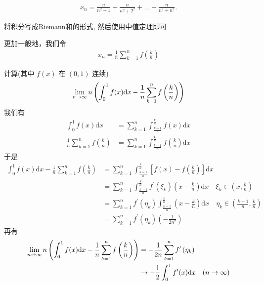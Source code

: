 \begin{exercise}[series=exer]
  \begin{align*}
      x_{n} = \frac{n}{n^{2} + 1} + \frac{n}{n^{2} + 2^{2}} + \dots + \frac{n}{n^{2} + n^{2}}.
  \end{align*}
  \begin{hint}
    将积分写成Riemann和的形式, 然后使用中值定理即可
  \end{hint}
  \begin{answer}
    更加一般地，我们令
    \begin{align*}
      x_{n}=\frac{1}{n} \sum_{k=1}^{n} f\left(\frac{k}{n}\right)  
    \end{align*}

   计算(其中 $f(x)$ 在 $(0,1)$ 连续)
  \begin{align*}
    \lim_{n \to \infty} n\left(\int_{0}^{1} f(x) \mathrm{d} x-\frac{1}{n} \sum_{k=1}^{n} f\left(\frac{k}{n}\right)\right)
  \end{align*}
  我们有
  \begin{align*}
    \int_{0}^{1} f(x) \mathrm{d} x &=\sum_{k=1}^{n} \int_{\frac{k-1}{n}}^{\frac{k}{n}} f(x) \mathrm{d} x \\
    \frac{1}{n} \sum_{k=1}^{n} f\left(\frac{k}{n}\right) &=\sum_{k=1}^{n} \int_{\frac{k-1}{n}}^{\frac{k}{n}} f\left(\frac{k}{n}\right) \mathrm{d} x
  \end{align*}
  于是
  \begin{align*}
    \int_{0}^{1} f(x) \mathrm{d} x-\frac{1}{n} \sum_{k=1}^{n} f\left(\frac{k}{n}\right) 
    &=\sum_{k=1}^{n} \int_{\frac{k-1}{n}}^{\frac{k}{n}}\left[f(x)-f\left(\frac{k}{n}\right)\right] \mathrm{d} x \\
    &=\sum_{k=1}^{n} \int_{\frac{k-1}{n}}^{\frac{k}{n}} f^{\prime}\left(\xi_{k}\right)\left(x-\frac{k}{n}\right) \mathrm{d} x \quad \xi_{k} \in\left(x, \frac{k}{n}\right) \\
    &=\sum_{k=1}^{n} f^{\prime}\left(\eta_{k}\right) \int_{\frac{k-1}{n}}^{\frac{k}{n}}\left(x-\frac{k}{n}\right) \mathrm{d} x \quad \eta_{k} \in\left(\frac{k-1}{n}, \frac{k}{n}\right) \\
    &=\sum_{k=1}^{n} f^{\prime}\left(\eta_{k}\right)\left(-\frac{1}{2 n^{2}}\right)
  \end{align*}
  再有
  \begin{align*}
    \limit{n}{\infty} n\left(\int_{0}^{1} f(x) \mathrm{d} x-\frac{1}{n} \sum_{k=1}^{n} f\left(\frac{k}{n}\right)\right) 
    &=-\frac{1}{2 n} \sum_{k=1}^{n} f^{\prime}\left(\eta_{k}\right) \\
    & \rightarrow-\frac{1}{2} \int_{0}^{1} f^{\prime}(x) \mathrm{d} x \quad(n \rightarrow \infty) \\

\end{align*}
\end{answer}
\end{exercise}
